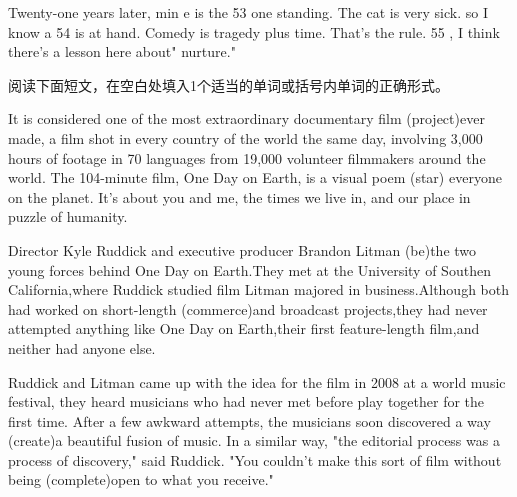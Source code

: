 \documentclass{英语试卷}
\begin{document}
\par Twenty-one years later, min e is the 53 one standing. The cat is very sick. so I know a 54 is at hand. Comedy is tragedy plus time. That's the rule. 55 , I think there's a lesson here about" nurture."\par
{}
\par 阅读下面短文，在空白处填入1个适当的单词或括号内单词的正确形式。\par
\par It is considered one of the most extraordinary documentary film  (project)ever made, a film shot in every country of the world  the same day, involving 3,000 hours of footage in 70 languages from 19,000 volunteer filmmakers around the world. The 104-minute film, One Day on Earth, is a visual poem  (star) everyone on the planet. It's about you and me, the times we live in, and our place in  puzzle of humanity.\par
\par Director Kyle Ruddick and executive producer Brandon Litman  (be)the two young forces behind One Day on Earth.They met at the University of Southen California,where Ruddick studied film  Litman majored in business.Although both had worked on short-length  (commerce)and broadcast projects,they had never attempted anything like One Day on Earth,their first feature-length film,and neither had anyone else.\par
\par Ruddick and Litman came up with the idea for the film in 2008 at a world music festival,  they heard musicians who had never met before play together for the first time. After a few awkward attempts, the musicians soon discovered a way  (create)a beautiful fusion of music. In a similar way, "the editorial process was a process of discovery," said Ruddick. "You couldn't make this sort of film without being  (complete)open to what you receive."\par
\end{document}
